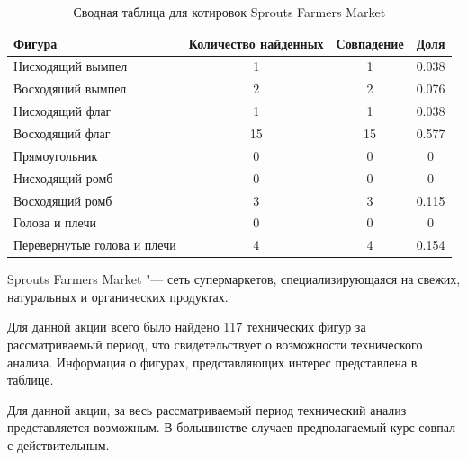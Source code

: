 \documentclass[bachelor, och, coursework]{SCWorks}
\begin{document}
        \begin{table}[!hbt]
            \caption{Сводная таблица для котировок Sprouts Farmers Market} 
            \centering
            \begin{tabular}{|l|c|c|c|}
            \hline
            Фигура                      & \multicolumn{1}{l|}{Количество найденных} & Совпадение & Доля  \\ \hline
            Нисходящий вымпел           & 1                                         & 1          & 0.038 \\ \hline
            Восходящий вымпел           & 2                                         & 2          & 0.076 \\ \hline
            Нисходящий флаг             & 1                                         & 1          & 0.038 \\ \hline
            Восходящий флаг             & 15                                        & 15         & 0.577 \\ \hline
            Прямоугольник               & 0                                         & 0          & 0     \\ \hline
            Нисходящий ромб             & 0                                         & 0          & 0     \\ \hline
            Восходящий ромб             & 3                                         & 3          & 0.115 \\ \hline
            Голова и плечи              & 0                                         & 0          & 0     \\ \hline
            Перевернутые голова и плечи & 4                                         & 4          & 0.154 \\ \hline
            \end{tabular}
                 
        \end{table}
    
        
        Sprouts Farmers Market "--- сеть супермаркетов, специализирующаяся на 
        свежих, натуральных и органических продуктах.
    
        
        Для данной акции всего было найдено 117 технических фигур за 
        рассматриваемый период, что свидетельствует о возможности технического 
        анализа. Информация о фигурах, представляющих интерес представлена в 
        таблице.
        
        Для данной акции, за весь рассматриваемый период технический анализ 
        представляется возможным. В большинстве случаев предполагаемый курс 
        совпал с действительным.
        
\end{document}
